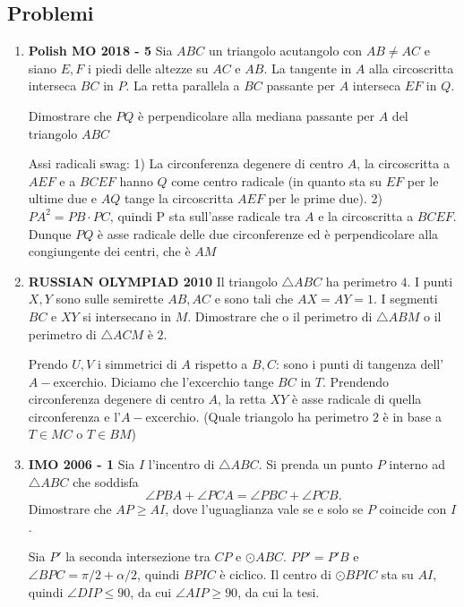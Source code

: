 \subsection{Problemi}
\begin{enumerate}
    \item \textbf{Polish MO 2018 - 5} Sia $ABC$ un triangolo acutangolo con $AB\neq AC$
    e siano $E,F$ i piedi delle altezze su $AC$ e $AB$. La tangente in $A$ alla circoscritta interseca $BC$ in $P$. La retta parallela a $BC$ passante per $A$ interseca $EF$ in $Q$. 
    
    Dimostrare che $PQ$ è perpendicolare alla mediana passante per $A$ del triangolo $ABC$
    
    \begin{sol}Assi radicali swag: 1) La circonferenza degenere di centro $A$, la circoscritta a $AEF$ e a $BCEF$ hanno $Q$ come centro radicale (in quanto sta su $EF$ per le ultime due e $AQ$ tange la circoscritta $AEF$ per le prime due). 2) $PA^2=PB\cdot PC$, quindi P sta sull'asse radicale tra $A$ e la circoscritta a $BCEF$. Dunque $PQ$ è asse radicale delle due circonferenze ed è perpendicolare alla congiungente dei centri, che è $AM$
    \end{sol}
    
    \item \textbf{RUSSIAN OLYMPIAD 2010} Il triangolo $\triangle ABC$ ha perimetro $4$. I punti $X,Y$ sono sulle semirette $AB,AC$ e sono tali che $AX=AY=1$. I segmenti $BC$ e $XY$ si intersecano in $M$. Dimostrare che o il perimetro di $\triangle ABM$ o il perimetro di $\triangle ACM$ è $2$.
    
    \begin{sol}
    Prendo $U,V$ i simmetrici di $A$ rispetto a $B,C$: sono i punti di tangenza dell'$A-$excerchio. Diciamo che l'excerchio tange $BC$ in $T$. Prendendo circonferenza degenere di centro $A$, la retta $XY$ è asse radicale di quella circonferenza e l'$A-$excerchio. (Quale triangolo ha perimetro $2$ è in base a $T\in MC$ o $T\in BM$)
    \end{sol}
    
    \item \textbf{IMO 2006 - 1} Sia $I$ l'incentro di $\triangle ABC$. Si prenda un punto $P$ interno ad $\triangle ABC$ che soddisfa 
    $$\angle PBA + \angle PCA = \angle PBC + \angle PCB.$$
    Dimostrare che $AP\geq AI$, dove l'uguaglianza vale se e solo se $P$ coincide con $I$.
    
    \begin{sol} 
    Sia $P'$ la seconda intersezione tra $CP$ e $\odot ABC$. $PP'=P'B$ e $\angle BPC = \pi/2 + \alpha/2$, quindi $BPIC$ è ciclico. Il centro di $\odot BPIC$ sta su $AI$, quindi $\angle DIP \leq 90$, da cui $\angle AIP\geq 90$, da cui la tesi.
    \end{sol}
    

\end{enumerate}
